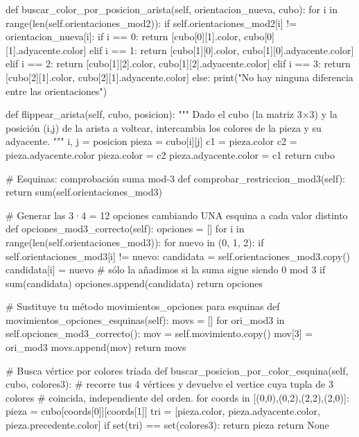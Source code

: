     def buscar_color_por_posicion_arista(self, orientacion_nueva, cubo):
        for i in range(len(self.orientaciones_mod2)):
            if self.orientaciones_mod2[i] != orientacion_nueva[i]:
                if i == 0:
                    return [cubo[0][1].color, cubo[0][1].adyacente.color]
                elif i == 1:
                    return [cubo[1][0].color, cubo[1][0].adyacente.color]
                elif i == 2:
                    return [cubo[1][2].color, cubo[1][2].adyacente.color]
                elif i == 3:
                    return [cubo[2][1].color, cubo[2][1].adyacente.color]
            else:
                print("No hay ninguna diferencia entre las orientaciones")
                
    def flippear_arista(self, cubo, posicion):
        """
        Dado el cubo (la matriz 3×3) y la posición (i,j) de la arista a voltear,
        intercambia los colores de la pieza y su adyacente.
        """
        i, j = posicion
        pieza = cubo[i][j]
        c1 = pieza.color
        c2 = pieza.adyacente.color
        pieza.color = c2
        pieza.adyacente.color = c1
        return cubo
    
    # Esquinas: comprobación suma mod-3
    def comprobar_restriccion_mod3(self):
        return sum(self.orientaciones_mod3) %

    # Generar las 3·4 = 12 opciones cambiando UNA esquina a cada valor distinto
    def opciones_mod3_correcto(self):
        opciones = []
        for i in range(len(self.orientaciones_mod3)):
            for nuevo in (0, 1, 2):
                if self.orientaciones_mod3[i] != nuevo:
                    candidata = self.orientaciones_mod3.copy()
                    candidata[i] = nuevo
                    # sólo la añadimos si la suma sigue siendo 0 mod 3
                    if sum(candidata) %
                        opciones.append(candidata)
        return opciones

    # Sustituye tu método movimientos_opciones para esquinas
    def movimientos_opciones_esquinas(self):
        movs = []
        for ori_mod3 in self.opciones_mod3_correcto():
            mov = self.movimiento.copy()
            mov[3] = ori_mod3
            movs.append(mov)
        return movs

    # Busca vértice por colores tríada
    def buscar_posicion_por_color_esquina(self, cubo, colores3):
        # recorre tus 4 vértices y devuelve el vertice cuya tupla de 3 colores
        # coincida, independiente del orden.
        for coords in [(0,0),(0,2),(2,2),(2,0)]:
            pieza = cubo[coords[0]][coords[1]]
            tri = [pieza.color,
                   pieza.adyacente.color,
                   pieza.precedente.color]
            if set(tri) == set(colores3):
                return pieza
        return None
    
